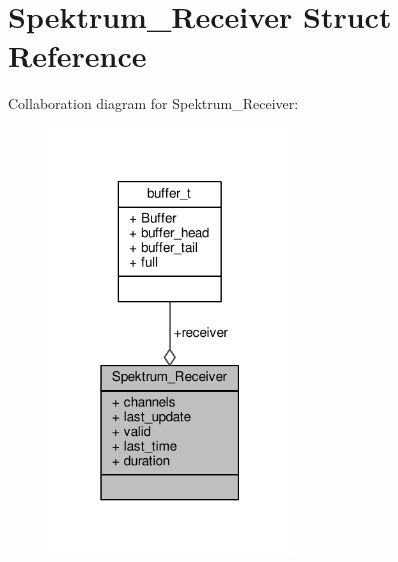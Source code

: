 \hypertarget{structSpektrum__Receiver}{\section{Spektrum\+\_\+\+Receiver Struct Reference}
\label{structSpektrum__Receiver}
}


Collaboration diagram for Spektrum\+\_\+\+Receiver\+:
\nopagebreak
\begin{figure}[H]
\begin{center}
\leavevmode
\includegraphics[width=183pt]{structSpektrum__Receiver__coll__graph}
\end{center}
\end{figure}
